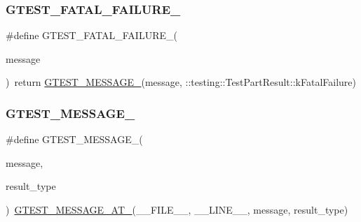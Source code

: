 \mbox{\label{_obj__test_2lib_2googletest-master_2googletest_2include_2gtest_2internal_2gtest-internal_8h_a0f9a4c3ea82cc7bf4478eaffdc168358}} 
\subsubsection{\texorpdfstring{GTEST\_FATAL\_FAILURE\_}{GTEST\_FATAL\_FAILURE\_}}
{\footnotesize\ttfamily \#define G\+T\+E\+S\+T\+\_\+\+F\+A\+T\+A\+L\+\_\+\+F\+A\+I\+L\+U\+R\+E\+\_\+(\begin{DoxyParamCaption}\item[{}]{message }\end{DoxyParamCaption})~return \mbox{\hyperlink{_obj__test_2lib_2googletest-release-1_88_81_2googletest_2include_2gtest_2internal_2gtest-internal_8h_a94c73d5368ec946bc354d0992ad00810}{G\+T\+E\+S\+T\+\_\+\+M\+E\+S\+S\+A\+G\+E\+\_\+}}(message, \+::testing\+::\+Test\+Part\+Result\+::k\+Fatal\+Failure)}

\mbox{\label{_obj__test_2lib_2googletest-master_2googletest_2include_2gtest_2internal_2gtest-internal_8h_a94c73d5368ec946bc354d0992ad00810}} 
\subsubsection{\texorpdfstring{GTEST\_MESSAGE\_}{GTEST\_MESSAGE\_}}
{\footnotesize\ttfamily \#define G\+T\+E\+S\+T\+\_\+\+M\+E\+S\+S\+A\+G\+E\+\_\+(\begin{DoxyParamCaption}\item[{}]{message,  }\item[{}]{result\+\_\+type }\end{DoxyParamCaption})~\mbox{\hyperlink{_obj__test_2lib_2googletest-release-1_88_81_2googletest_2include_2gtest_2internal_2gtest-internal_8h_a8d70025c45a47a493780746dfd66d565}{G\+T\+E\+S\+T\+\_\+\+M\+E\+S\+S\+A\+G\+E\+\_\+\+A\+T\+\_\+}}(\+\_\+\+\_\+\+F\+I\+L\+E\+\_\+\+\_\+, \+\_\+\+\_\+\+L\+I\+N\+E\+\_\+\+\_\+, message, result\+\_\+type)}

